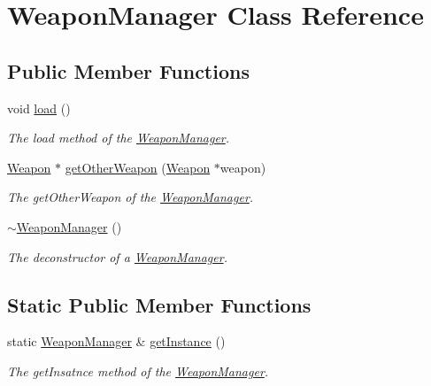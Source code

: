 \hypertarget{class_weapon_manager}{\section{Weapon\+Manager Class Reference}
\label{class_weapon_manager}
}
\subsection*{Public Member Functions}
\begin{DoxyCompactItemize}
\item 
void \hyperlink{class_weapon_manager_a6c96a12d89dc2e500fe830ce58d59d00}{load} ()
\begin{DoxyCompactList}\small\item\em The load method of the \hyperlink{class_weapon_manager}{Weapon\+Manager}. \end{DoxyCompactList}\item 
\hyperlink{class_weapon}{Weapon} $\ast$ \hyperlink{class_weapon_manager_a06a726626541c01ed4074e3a02d2d1fc}{get\+Other\+Weapon} (\hyperlink{class_weapon}{Weapon} $\ast$weapon)
\begin{DoxyCompactList}\small\item\em The get\+Other\+Weapon of the \hyperlink{class_weapon_manager}{Weapon\+Manager}. \end{DoxyCompactList}\item 
\hypertarget{class_weapon_manager_a240f037e5294e11081ca3cce1ab4651e}{\hyperlink{class_weapon_manager_a240f037e5294e11081ca3cce1ab4651e}{$\sim$\+Weapon\+Manager} ()}\label{class_weapon_manager_a240f037e5294e11081ca3cce1ab4651e}

\begin{DoxyCompactList}\small\item\em The deconstructor of a \hyperlink{class_weapon_manager}{Weapon\+Manager}. \end{DoxyCompactList}\end{DoxyCompactItemize}
\subsection*{Static Public Member Functions}
\begin{DoxyCompactItemize}
\item 
static \hyperlink{class_weapon_manager}{Weapon\+Manager} \& \hyperlink{class_weapon_manager_a397c93681bbba0a24f285d2e699b82f3}{get\+Instance} ()
\begin{DoxyCompactList}\small\item\em The get\+Insatnce method of the \hyperlink{class_weapon_manager}{Weapon\+Manager}. \end{DoxyCompactList}\end{DoxyCompactItemize}
